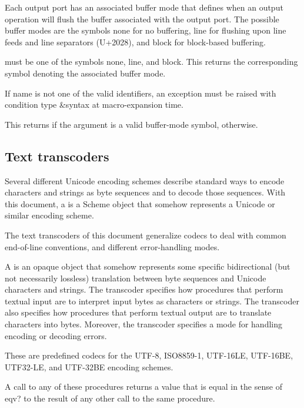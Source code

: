 Each output port has an associated buffer mode that defines when an
output operation will flush the buffer associated with the output
port. The possible buffer modes are the symbols none for no buffering,
line for flushing upon line feeds and line separators (U+2028), and
block for block-based buffering.

\begin{entry}{%
}
   
 must be one of the symbols {\cf none}, {\cf line}, and
{\cf block}. This returns the corresponding symbol denoting the
associated buffer mode.

If name is not one of the valid identifiers, an exception must be
raised with condition type {\cf\&syntax} at macro-expansion time.
\end{entry}

\begin{entry}{%
}
   
This returns \schtrue{} if the argument is a valid buffer-mode symbol,
\schfalse{} otherwise.
\end{entry}

\subsection{Text transcoders}

Several different Unicode encoding schemes describe standard ways to
encode characters and strings as byte sequences and to decode those
sequences.  With this document, a  is a Scheme object
that somehow represents a Unicode or similar encoding scheme.

The text transcoders of this document generalize codecs
to deal with common end-of-line conventions, and different
error-handling modes.

A  is an opaque object that somehow represents
some specific bidirectional (but not necessarily lossless) translation
between byte sequences and Unicode characters and strings.  The
transcoder specifies how procedures that perform textual input are to
interpret input bytes as characters or strings.  The transcoder also
specifies how procedures that perform textual output are to translate
characters into bytes.  Moreover, the transcoder specifies a
mode for handling encoding or decoding errors.

\begin{entry}{%
}

These are predefined codecs for the UTF-8, ISO8859-1,
UTF-16LE, UTF-16BE, UTF32-LE, and UTF-32BE encoding
schemes.

A call to any of these procedures returns a value that is equal in the
sense of {\cf eqv?} to the result of any other call to the same
procedure.
\end{entry}

